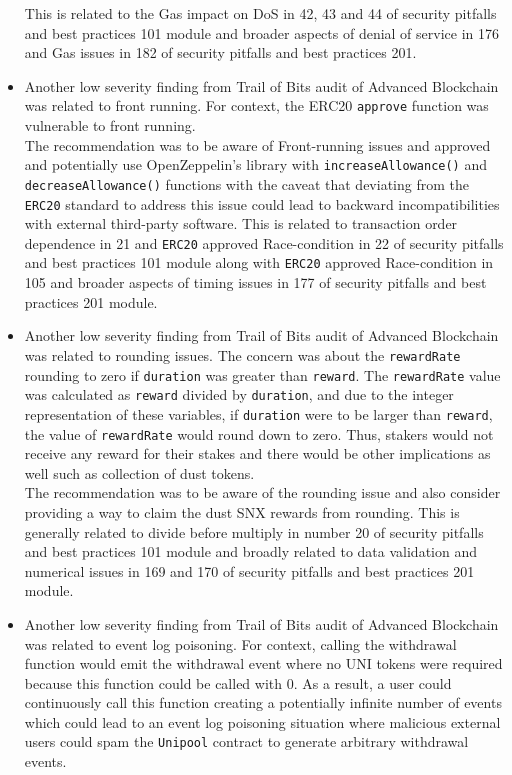 \begin{itemize}
  This is related to the Gas impact on DoS in 42, 43 and 44 of security
  pitfalls and best practices 101 module and broader aspects of denial
  of service in 176 and Gas issues in 182 of security pitfalls and best
  practices 201.
\item
  Another low severity finding from Trail of Bits audit of Advanced
  Blockchain was related to front running. For context, the ERC20
  \texttt{approve} function was vulnerable to front running.\\

  The recommendation was to be aware of Front-running issues and
  approved and potentially use OpenZeppelin's library with
  \texttt{increaseAllowance()} and \texttt{decreaseAllowance()}
  functions with the caveat that deviating from the \texttt{ERC20}
  standard to address this issue could lead to backward
  incompatibilities with external third-party software. This is related
  to transaction order dependence in 21 and \texttt{ERC20} approved
  Race-condition in 22 of security pitfalls and best practices 101
  module along with \texttt{ERC20} approved Race-condition in 105 and
  broader aspects of timing issues in 177 of security pitfalls and best
  practices 201 module.
\item
  Another low severity finding from Trail of Bits audit of Advanced
  Blockchain was related to rounding issues. The concern was about the
  \texttt{rewardRate} rounding to zero if \texttt{duration} was greater
  than \texttt{reward}. The \texttt{rewardRate} value was calculated as
  \texttt{reward} divided by \texttt{duration}, and due to the integer
  representation of these variables, if \texttt{duration} were to be
  larger than \texttt{reward}, the value of \texttt{rewardRate} would
  round down to zero. Thus, stakers would not receive any reward for
  their stakes and there would be other implications as well such as
  collection of dust tokens.\\

  The recommendation was to be aware of the rounding issue and also
  consider providing a way to claim the dust SNX rewards from rounding.
  This is generally related to divide before multiply in number 20 of
  security pitfalls and best practices 101 module and broadly related to
  data validation and numerical issues in 169 and 170 of security
  pitfalls and best practices 201 module.
\item
  Another low severity finding from Trail of Bits audit of Advanced
  Blockchain was related to event log poisoning. For context, calling
  the withdrawal function would emit the withdrawal event where no UNI
  tokens were required because this function could be called with 0. As
  a result, a user could continuously call this function creating a
  potentially infinite number of events which could lead to an event log
  poisoning situation where malicious external users could spam the
  \texttt{Unipool} contract to generate arbitrary withdrawal events.\\


\end{itemize}
